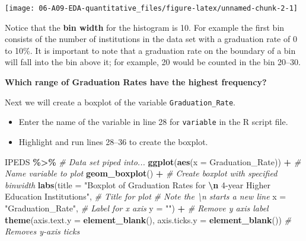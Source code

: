 \documentclass[
]{report}
\newenvironment{Shaded}{\begin{snugshade}}{\end{snugshade}}
\newcommand{\AttributeTok}[1]{\textcolor[rgb]{0.13,0.29,0.53}{#1}}
\newcommand{\CommentTok}[1]{\textcolor[rgb]{0.56,0.35,0.01}{\textit{#1}}}
\newcommand{\FunctionTok}[1]{\textcolor[rgb]{0.13,0.29,0.53}{\textbf{#1}}}
\newcommand{\NormalTok}[1]{#1}
\newcommand{\SpecialCharTok}[1]{\textcolor[rgb]{0.81,0.36,0.00}{\textbf{#1}}}
\newcommand{\StringTok}[1]{\textcolor[rgb]{0.31,0.60,0.02}{#1}}
\begin{document}
\begin{center}\texttt{[image: 06-A09-EDA-quantitative\_files/figure-latex/unnamed-chunk-2-1]} \end{center}

Notice that the \textbf{bin width} for the histogram is 10. For example the first bin consists of the number of institutions in the data set with a graduation rate of 0 to 10\%. It is important to note that a graduation rate on the boundary of a bin will fall into the bin above it; for example, 20 would be counted in the bin 20--30.

\textbf{Which range of Graduation Rates have the highest frequency?}

\vspace{0.3in}

Next we will create a boxplot of the variable \texttt{Graduation\_Rate}.

\begin{itemize}
\item
  Enter the name of the variable in line 28 for \texttt{variable} in the R script file.
\item
  Highlight and run lines 28--36 to create the boxplot.
\end{itemize}

\begin{Shaded}
\begin{Highlighting}[]
\NormalTok{IPEDS }\SpecialCharTok{\%\textgreater{}\%} \CommentTok{\# Data set piped into...}
\FunctionTok{ggplot}\NormalTok{(}\FunctionTok{aes}\NormalTok{(}\AttributeTok{x =}\NormalTok{ Graduation\_Rate)) }\SpecialCharTok{+}   \CommentTok{\# Name variable to plot}
  \FunctionTok{geom\_boxplot}\NormalTok{() }\SpecialCharTok{+}  \CommentTok{\# Create boxplot with specified binwidth}
  \FunctionTok{labs}\NormalTok{(}\AttributeTok{title =} \StringTok{"Boxplot of Graduation Rates for }\SpecialCharTok{\textbackslash{}n}\StringTok{ 4{-}year Higher Education Institutions"}\NormalTok{, }
           \CommentTok{\# Title for plot}
           \CommentTok{\# Note the \textbackslash{}n starts a new line}
       \AttributeTok{x =} \StringTok{"Graduation\_Rate"}\NormalTok{, }\CommentTok{\# Label for x axis}
       \AttributeTok{y =} \StringTok{""}\NormalTok{) }\SpecialCharTok{+} \CommentTok{\# Remove y axis label}
    \FunctionTok{theme}\NormalTok{(}\AttributeTok{axis.text.y =} \FunctionTok{element\_blank}\NormalTok{(), }
          \AttributeTok{axis.ticks.y =} \FunctionTok{element\_blank}\NormalTok{()) }\CommentTok{\# Removes y{-}axis ticks}
\end{Highlighting}
\end{Shaded}
\end{document}
